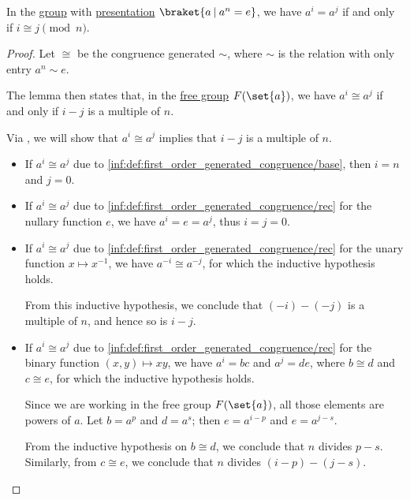 \begin{lemma}\label{thm:finite_cyclic_group_order}
  In the \hyperref[def:group]{group} with \hyperref[def:group_presentation]{presentation} \( \braket{ a \given a^n = e } \), we have \( a^i = a^j \) if and only if \( i \cong j \pmod n \).
\end{lemma}
\begin{proof}
  Let \( {\cong} \) be the congruence generated \( {\sim} \), where \( {\sim} \) is the relation with only entry \( a^n \sim e \).

  The lemma then states that, in the \hyperref[def:free_group]{free group} \( F(\set{ a }) \), we have \( a^i \cong a^j \) if and only if \( i - j \) is a multiple of \( n \).

  \SufficiencySubProof Via , we will show that \( a^i \cong a^j \) implies that \( i - j \) is a multiple of \( n \).
  \begin{itemize}
    \item If \( a^i \cong a^j \) due to \ref{inf:def:first_order_generated_congruence/base}, then \( i = n \) and \( j = 0 \).

    \item If \( a^i \cong a^j \) due to \ref{inf:def:first_order_generated_congruence/rec} for the nullary function \( e \), we have \( a^i = e = a^j \), thus \( i = j = 0 \).

    \item If \( a^i \cong a^j \) due to \ref{inf:def:first_order_generated_congruence/rec} for the unary function \( x \mapsto x^{-1} \), we have \( a^{-i} \cong a^{-j} \), for which the inductive hypothesis holds.

    From this inductive hypothesis, we conclude that \( (-i) - (-j) \) is a multiple of \( n \), and hence so is \( i - j \).

    \item If \( a^i \cong a^j \) due to \ref{inf:def:first_order_generated_congruence/rec} for the binary function \( (x, y) \mapsto xy \), we have \( a^i = bc \) and \( a^j = de \), where \( b \cong d \) and \( c \cong e \), for which the inductive hypothesis holds.

    Since we are working in the free group \( F(\set{ a }) \), all those elements are powers of \( a \). Let \( b = a^p \) and \( d = a^s \); then \( e = a^{i - p} \) and \( e = a^{j - s} \).

    From the inductive hypothesis on \( b \cong d \), we conclude that \( n \) divides \( p - s \). Similarly, from \( c \cong e \), we conclude that \( n \) divides \( (i - p) - (j - s) \).


\end{itemize}
\end{proof}
